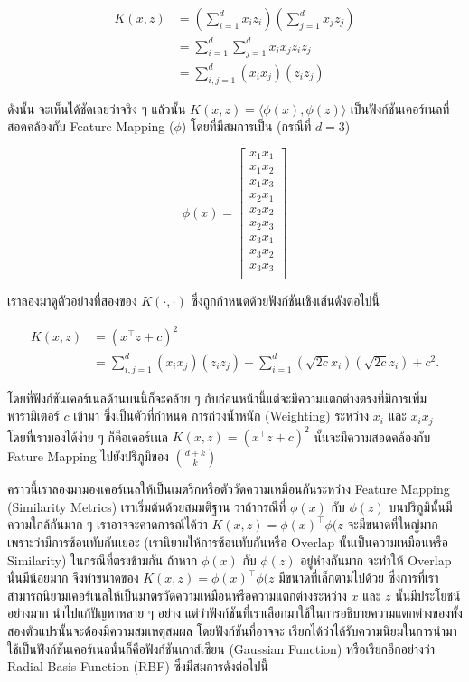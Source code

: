 \begin{align}
    K(x,z) &= \left( \sum_{i=1}^d x_i z_i \right) \left( \sum_{j=1}^d x_j z_j \right)\\
    &= \sum_{i=1}^d \sum_{j=1}^d x_i x_j z_i z_j\\
    &= \sum_{i,j=1}^d (x_i x_j)(z_i z_j)
\end{align}

\noindent ดังนั้น จะเห็นได้ชัดเลยว่าจริง ๆ แล้วนั้น $K(x,z) = \langle\phi(x),\phi(z)\rangle$ เป็นฟังก์ชันเคอร์เนลที่สอดคล้องกับ
Feature Mapping ($\phi$) โดยที่มีสมการเป็น (กรณีที่ $d = 3$)

\begin{equation}
    \phi(x) = \begin{bmatrix}
    x_1 x_1\\
    x_1 x_2\\
    x_1 x_3\\
    x_2 x_1\\
    x_2 x_2\\
    x_2 x_3\\
    x_3 x_1\\
    x_3 x_2\\
    x_3 x_3\\
    \end{bmatrix}
\end{equation}

เราลองมาดูตัวอย่างที่สองของ $K(\cdot,\cdot)$ ซึ่งถูกกำหนดด้วยฟังก์ชันเชิงเส้นดังต่อไปนี้

\begin{align}
    K(x,z) &= (x^{\top} z + c)^2\\
    &= \sum_{i,j=1}^d (x_i x_j)(z_i z_j) + \sum_{i=1}^d \left(\sqrt{2c}x_i\right) \left(\sqrt{2c}z_i\right) + c^2.
\end{align}

\noindent โดยที่ฟังก์ชันเคอร์เนลด้านบนนี้ก็จะคล้าย ๆ กับก่อนหน้านี้แต่จะมีความแตกต่างตรงที่มีการเพิ่มพารามิเตอร์ $c$ เข้ามา ซึ่งเป็นตัวที่กำหนด%
การถ่วงน้ำหนัก (Weighting) ระหว่าง $x_{i}$ และ $x_{i}x_{j}$ โดยที่เรามองได้ง่าย ๆ ก็คือเคอร์เนล $K(x,z) = (x^{\top} z + c)^2$
นั้นจะมีความสอดคล้องกับ Fature Mapping ไปยังปริภูมิของ $\binom{d+k}{k}$

คราวนี้เราลองมามองเคอร์เนลให้เป็นเมตริกหรือตัววัดความเหมือนกันระหว่าง Feature Mapping (Similarity Metrics) เราเริ่มต้นด้วยสมมติฐาน%
ว่าถ้ากรณีที่ $\phi(x)$ กับ $\phi(z)$ บนปริภูมินั้นมีความใกล้กันมาก ๆ เราอาจจะคาดการณ์ได้ว่า $K(x,z) = \phi(x)^{\top} \phi(z$
จะมีขนาดที่ใหญ่มากเพราะว่ามีการซ้อนทับกันเยอะ (เรานิยามให้การซ้อนทับกันหรือ Overlap นั้นเป็นความเหมือนหรือ Similarity) ในกรณีที่ตรงข้ามกัน
ถ้าหาก $\phi(x)$ กับ $\phi(z)$ อยู่ห่างกันมาก จะทำให้ Overlap นั้นมีน้อยมาก จึงทำขนาดของ $K(x,z) = \phi(x)^{\top} \phi(z$ 
มีขนาดที่เล็กตามไปด้วย ซึ่งการที่เราสามารถนิยามเคอร์เนลให้เป็นมาตรวัดความเหมือนหรือความแตกต่างระหว่าง $x$ และ $z$ นั้นมีประโยชน์อย่างมาก%
นำไปแก้ปัญหาหลาย ๆ อย่าง แต่ว่าฟังก์ชันที่เราเลือกมาใช้ในการอธิบายความแตกต่างของทั้งสองตัวแปรนั้นจะต้องมีความสมเหตุสมผล โดยฟังก์ชันที่อาจจะ%
เรียกได้ว่าได้รับความนิยมในการนำมาใช้เป็นฟังก์ชันเคอร์เนลนั้นก็คือฟังก์ชันเกาส์เซียน (Gaussian Function) หรือเรียกอีกอย่างว่า Radial Basis
Function (RBF) ซึ่งมีสมการดังต่อไปนี้ 


